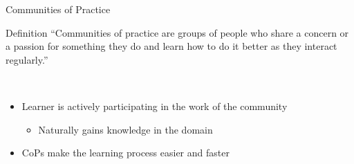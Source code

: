 \begin{frame}{Communities of Practice}
  \begin{block}{Definition}
    ``Communities of practice are groups of people who share a concern or a
    passion for something they do and learn how to do it better as they interact regularly.'' \cite{Weng98}
  \end{block}
  \ \\
  \begin{itemize}
    \item Learner is actively participating in the work of the community
    \begin{itemize}
        \item Naturally gains knowledge in the domain
    \end{itemize}
    \item CoPs make the learning process easier and faster \cite{CuZe05}
    
  \end{itemize}

   
\end{frame}


